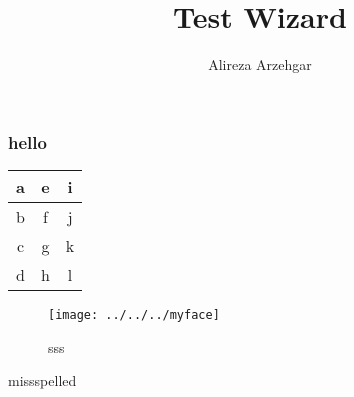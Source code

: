 \documentclass[11pt]{beamer}
\begin{document}
	\author{Alireza Arzehgar}
	\title{Test Wizard}
	\begin{frame}[plain]
		\maketitle
	\end{frame}
	
	\begin{frame}
		\frametitle{hello}
		
		
	\end{frame}
	
	\begin{frame}
		\begin{tabular}{|c|c|c|}
			\hline
			a & e & i \\
			\hline
			b & f & j \\
			\hline
			c & g & k \\
			\hline
			d & h & l \\
			\hline
		\end{tabular}
	\end{frame}

	\begin{frame}
		\begin{figure}
			\centering
			\texttt{[image: ../../../myface]}
			\caption{sss}
			\label{fig:myface}
		\end{figure}
	\end{frame}
	

	
	missspelled
\end{document}
